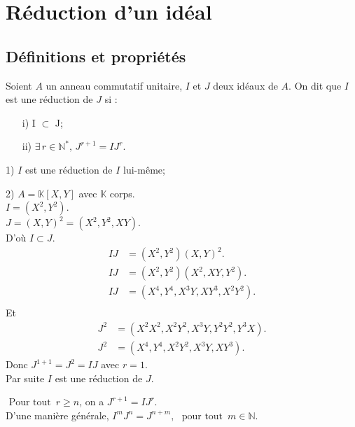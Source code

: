 \section{Réduction d'un idéal}
\subsection{Définitions et propriétés}
\begin{madefinition}
	Soient $A$ un anneau commutatif unitaire, $I$ et $J$ deux id\'eaux de $A$.
	On dit que $I$ est une réduction de $J$ si :
	\begin{enumerate}
		\item[i)] I $\subset$ J;
		\item[ii)] $\exists\, r\in \mathbb{N}^{*} \text{, } J^{r+1} = IJ^{r}$.
	\end{enumerate}
\end{madefinition}
\begin{monexemple}
		\item[1)] $I$ est une réduction de $I$ lui-même;
		\item[2)] $A =\mathbb{K}[X,Y]$ avec $\mathbb{K}$ corps.\\
		$I = (X^2, Y^2)$.\\
		$J = (X,Y)^2 = (X^2, Y^2, XY) $.\\
		D'où $I \subset J$.
		\begin{align*}
			IJ&= (X^{2},Y^{2})(X,Y)^{2}.\\
			IJ&= (X^{2},Y^{2})(X^{2},XY,Y^{2}).\\
			IJ&= (X^{4},Y^{4},X^{3}Y,XY^{3},X^{2}Y^{2}).\\
		\end{align*}
		Et \\ 
		\begin{align*}
			J^2 &= (X^2X^2, X^2Y^2, X^3Y, Y^2Y^2, Y^3X).\\
			J^2&= (X^4, Y^4, X^2Y^2, X^3Y, XY^3).
		\end{align*}
		Donc $J^{1+1} = J^2 = IJ $ avec $r=1$.\\
		Par suite $I$ est une réduction de $J$.
\end{monexemple}
\begin{maremarque}
	$\text{ Pour tout } \, r\geq n$, on a $J^{r+1} = IJ^{r}$.\\
	D'une manière générale, $I^{m}J^{n}=J^{n+m}, \, \, \text{ pour tout } \, m\in \mathbb{N}$.	
\end{maremarque}


